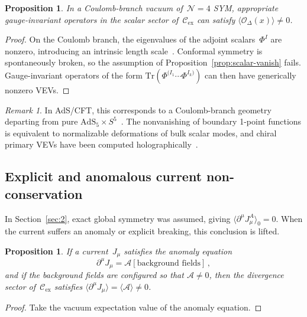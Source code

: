 \documentclass[
  aps,
  prd,
  preprint,
  groupedaddress,
  nofootinbib,
  longbibliography
]{revtex4-2}
\newtheorem{proposition}[definition]{Proposition}
\theoremstyle{remark}
\newtheorem{remark}[definition]{Remark}
\newcommand{\Cex}{\mathcal{C}_{\mathrm{ex}}}
\newcommand{\N}{\mathcal{N}}
\newcommand{\AdS}{\mathrm{AdS}}
\begin{document}
\begin{proposition}\label{prop:Coulomb}
In a Coulomb-branch vacuum of~$\N=4$ SYM, appropriate
gauge-invariant operators in the scalar sector of~$\Cex$ can
satisfy $\langle\mathcal{O}_\Delta(x)\rangle\neq 0$.
\end{proposition}

\begin{proof}
On the Coulomb branch, the eigenvalues of the adjoint
scalars~$\Phi^I$ are nonzero, introducing an intrinsic length
scale~\cite{ref4,ref6,ref7}.
Conformal symmetry is spontaneously broken, so the assumption
of Proposition~\ref{prop:scalar-vanish} fails.
Gauge-invariant operators of the form
$\mathrm{Tr}(\Phi^{(I_1}\cdots\Phi^{I_k)})$ can then have
generically nonzero VEVs.
\end{proof}

\begin{remark}\label{rem:Coulomb-holo}
In AdS/CFT, this corresponds to a Coulomb-branch geometry
departing from pure $\AdS_5\times
S^5$~\cite{ref1,ref4,ref7}.
The nonvanishing of boundary 1-point functions is equivalent
to normalizable deformations of bulk scalar modes, and chiral
primary VEVs have been computed
holographically~\cite{ref9,ref10,ref11,ref45}.
\end{remark}

\subsection{Explicit and anomalous current non-conservation}%
  \label{subsec:3-6}

In Section~\ref{sec:2}, exact global symmetry was assumed, giving
$\langle\partial^\mu J_\mu^A\rangle_0=0$.
When the current suffers an anomaly or explicit breaking, this
conclusion is lifted.

\begin{proposition}\label{prop:anomaly}
If a current~$J_\mu$ satisfies the anomaly equation
\begin{equation}\label{eq:anomaly}
  \partial^\mu J_\mu
  = \mathcal{A}[\text{background fields}]\,,
\end{equation}
and if the background fields are configured so that
$\mathcal{A}\neq 0$, then the divergence sector of~$\Cex$
satisfies
$\langle\partial^\mu J_\mu\rangle
= \langle\mathcal{A}\rangle\neq 0$.
\end{proposition}

\begin{proof}
Take the vacuum expectation value of the anomaly equation.
\end{proof}
\end{document}
